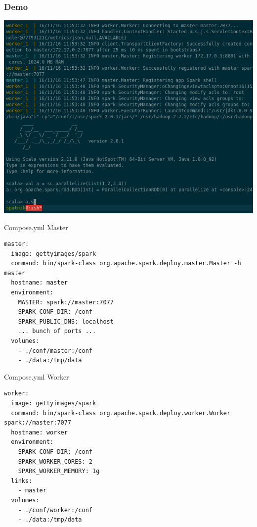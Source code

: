 \documentclass{beamer}
\begin{document}
\begin{frame}[fragile]
  \frametitle{Demo}
  \centering
\href{https://asciinema.org/a/92977}{\includegraphics[width=\textwidth]{gif/sparkrepl-thumb.png}}

\end{frame}
\begin{frame}[fragile]{Compose.yml Master}
\begin{lstlisting}[basicstyle=\ttfamily,language={},linebackgroundcolor={
    \btLstHL<1>{2}%
    \btLstHL<2>{3}%
    \btLstHL<3>{11}%
    \btLstHL<4>{12}%
    }]
master:
  image: gettyimages/spark
  command: bin/spark-class org.apache.spark.deploy.master.Master -h master
  hostname: master
  environment:
    MASTER: spark://master:7077
    SPARK_CONF_DIR: /conf
    SPARK_PUBLIC_DNS: localhost
    ... bunch of ports ...
  volumes:
    - ./conf/master:/conf
    - ./data:/tmp/data
  \end{lstlisting}
\end{frame}
\begin{frame}[fragile]{Compose.yml Worker}
\begin{lstlisting}[language={},basicstyle=\ttfamily,linebackgroundcolor={
    \btLstHL<1>{2}%
    \btLstHL<2>{3}%
    \btLstHL<3>{12,13}%
    \btLstHL<4>{6-8}%
    }]
worker:
  image: gettyimages/spark
  command: bin/spark-class org.apache.spark.deploy.worker.Worker spark://master:7077
  hostname: worker
  environment:
    SPARK_CONF_DIR: /conf
    SPARK_WORKER_CORES: 2
    SPARK_WORKER_MEMORY: 1g
  links:
    - master
  volumes:
    - ./conf/worker:/conf
    - ./data:/tmp/data
    \end{lstlisting}
\end{frame}
\end{document}
